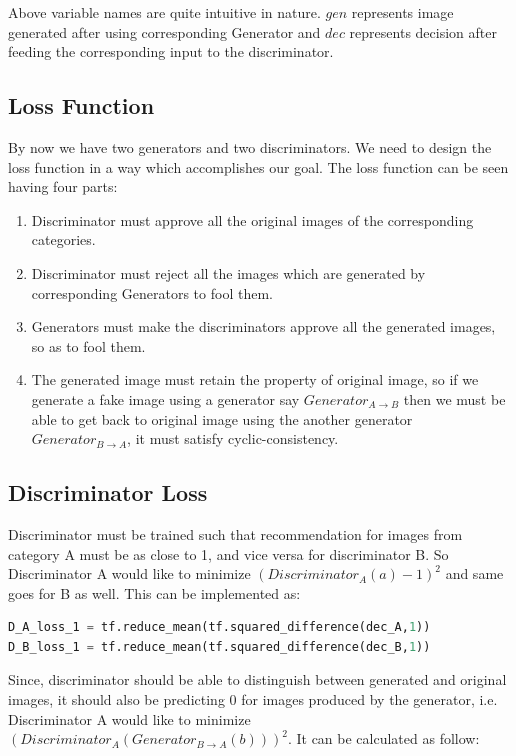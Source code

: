 \documentclass[peerreview]{IEEEtran}
\begin{document}
Above variable names are quite intuitive in nature. $gen$ represents image generated after using corresponding Generator and $dec$ represents decision after feeding the corresponding input to the discriminator.

\subsection{Loss Function}
By now we have two generators and two discriminators. We need to design the loss function in a way which accomplishes our goal. The loss function can be seen having four parts:

\begin{enumerate}
  \item Discriminator must approve all the original images of the corresponding categories.
  \item Discriminator must reject all the images which are generated by corresponding Generators to fool them.
  \item Generators must make the discriminators approve all the generated images, so as to fool them.
  \item The generated image must retain the property of original image, so if we generate a fake image using a generator say $Generator_{A \to B}$ then we must be able to get back to original image using the another generator $Generator_{B \to A}$, it must satisfy cyclic-consistency.
\end{enumerate}

\subsection*{Discriminator Loss}
Discriminator must be trained such that recommendation for images from category A must be as close to 1, and vice versa for discriminator B. So Discriminator A would like to minimize $(Discriminator_A(a)−1)^2$ and same goes for B as well. This can be implemented as:

\begin{lstlisting}[language=Python]
D_A_loss_1 = tf.reduce_mean(tf.squared_difference(dec_A,1))
D_B_loss_1 = tf.reduce_mean(tf.squared_difference(dec_B,1))
\end{lstlisting}

Since, discriminator should be able to distinguish between generated and original images, it should also be predicting 0 for images produced by the generator, i.e. Discriminator A would like to minimize $(Discriminator_A(Generator_{B \to A}(b)))^2$. It can be calculated as follow:
\end{document}
